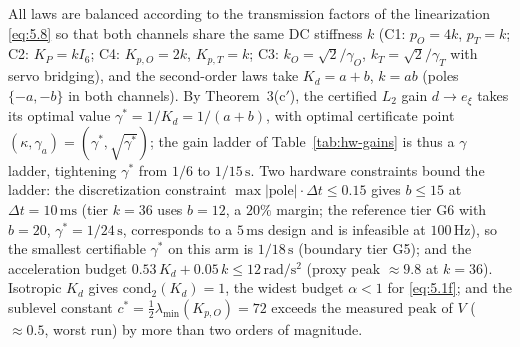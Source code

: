 All laws are balanced according to the transmission factors of the linearization \eqref{eq:5.8} so that both channels share the same DC stiffness $k$ (C1: $p_O{=}4k$, $p_T{=}k$; C2: $K_P{=}kI_6$; C4: $K_{p,O}{=}2k$, $K_{p,T}{=}k$; C3: $k_O{=}\sqrt2/\gamma_O$, $k_T{=}\sqrt2/\gamma_T$ with servo bridging), and the second-order laws take $K_d=a+b$, $k=ab$ (poles $\{-a,-b\}$ in both channels). By Theorem~3(c$'$), the certified $L_2$ gain $d\to e_\xi$ takes its optimal value $\gamma^{*}=1/K_d=1/(a+b)$, with optimal certificate point $(\kappa,\gamma_a)=(\gamma^{*},\sqrt{\gamma^{*}})$; the gain ladder of Table~\ref{tab:hw-gains} is thus a $\gamma$ ladder, tightening $\gamma^{*}$ from $1/6$ to $1/15\,\mathrm{s}$. Two hardware constraints bound the ladder: the discretization constraint $\max|\text{pole}|\cdot\Delta t\le0.15$ gives $b\le15$ at $\Delta t=10\,\mathrm{ms}$ (tier $k{=}36$ uses $b{=}12$, a $20\%$ margin; the reference tier G6 with $b{=}20$, $\gamma^{*}=1/24\,\mathrm{s}$, corresponds to a $5\,\mathrm{ms}$ design and is infeasible at $100\,\mathrm{Hz}$), so the smallest certifiable $\gamma^{*}$ on this arm is $1/18\,\mathrm{s}$ (boundary tier G5); and the acceleration budget $0.53\,K_d+0.05\,k\le12\,\mathrm{rad/s^2}$ (proxy peak $\approx9.8$ at $k{=}36$). Isotropic $K_d$ gives $\mathrm{cond}_2(K_d)=1$, the widest budget $\alpha<1$ for \eqref{eq:5.1f}; and the sublevel constant $c^{*}=\tfrac12\lambda_{\min}(K_{p,O})=72$ exceeds the measured peak of $V$ ($\approx0.5$, worst run) by more than two orders of magnitude.

